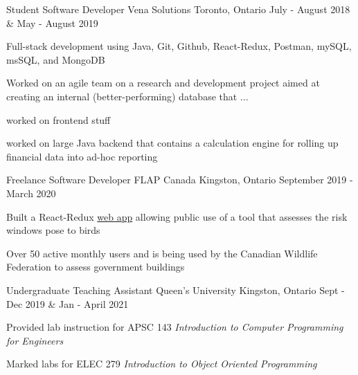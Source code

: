 \begin{cventries}
  \cventry
    {Student Software Developer} %
    {Vena Solutions} %
    {Toronto, Ontario} %
    {July - August 2018 \& May - August 2019} %
    {
      \begin{cvitems} %
        \item {Full-stack development using Java, Git, Github, React-Redux, Postman, mySQL, msSQL, and MongoDB}
        \item{Worked on an agile team on a research and development project aimed at creating an internal (better-performing) database that ...}
        \item{worked on frontend stuff}
        \item{worked on large Java backend that contains a calculation engine for rolling up financial data into ad-hoc reporting}
      \end{cvitems}
    }

  \cventry
    {Freelance Software Developer} %
    {FLAP Canada} %
    {Kingston, Ontario} %
    {September 2019 - March 2020} %
    {
      \begin{cvitems} %
        \item {Built a React-Redux \href{https://www.flapapp.ca/}{web app} allowing public use of a tool that assesses the risk windows pose to birds}
        \item{Over 50 active monthly users and is being used by the Canadian Wildlife Federation to assess government buildings}
      \end{cvitems}
    }

  \cventry
    {Undergraduate Teaching Assistant} %
    {Queen's University} %
    {Kingston, Ontario} %
    {Sept - Dec 2019 \& Jan - April 2021} %
    {
      \begin{cvitems} %
        \item{Provided lab instruction for APSC 143 \textit{Introduction to Computer Programming for Engineers}}
        \item{Marked labs for ELEC 279 \textit{Introduction to Object Oriented Programming}}
      \end{cvitems}
    }


\end{cventries}
